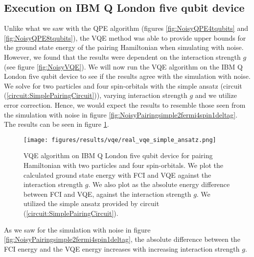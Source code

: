 \subsection{Execution on IBM Q London five qubit device}
Unlike what we saw with the QPE algorithm (figures \ref{fig:NoisyQPE4tqubits} and \ref{fig:NoisyQPE8tqubits}), the VQE method was able to provide upper bounds for the ground state energy of the pairing Hamiltonian when simulating with noise. However, we found that the results were dependent on the interaction strength $g$ (see figure \ref{fig:NoisyVQE}). We will now run the VQE algorithm on the IBM Q London five qubit device to see if the results agree with the simulation with noise. We solve for two particles and four spin-orbitals with the simple ansatz (circuit (\ref{circuit:SimplePairingCircuit})), varying interaction strength $g$ and we utilize error correction. Hence, we would expect the results to resemble those seen from the simulation with noise in figure \ref{fig:NoisyPairingsimple2fermi4spin1deltag}. The results can be seen in figure \ref{fig:VQEReal2fermi4spinorbs}.

\begin{figure}[H]
    \centering
    \texttt{[image: figures/results/vqe/real\_vqe\_simple\_ansatz.png]}
    \caption{VQE algorithm on IBM Q London five qubit device for pairing Hamiltonian with two particles and four spin-orbitals. We plot the calculated ground state energy with FCI and VQE against the interaction strength $g$. We also plot as the absolute energy difference between FCI and VQE, against the interaction strength $g$. We utilized the simple ansatz provided by circuit (\ref{circuit:SimplePairingCircuit}).}
    \label{fig:VQEReal2fermi4spinorbs}
\end{figure}
As we saw for the simulation with noise in figure \ref{fig:NoisyPairingsimple2fermi4spin1deltag}, the absolute difference between the FCI energy and the VQE energy increases with increasing interaction strength $g$.

